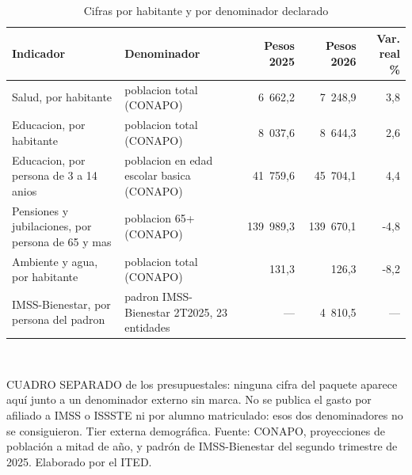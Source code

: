 \begin{table}[htbp]
\centering
\scriptsize
\caption{Cifras por habitante y por denominador declarado}
\label{cua:C14_1}
\begin{tabular}{p{5.0cm}p{4.4cm}rrr}
\toprule
\textbf{Indicador} & \textbf{Denominador} & \textbf{Pesos 2025} & \textbf{Pesos 2026} & \textbf{Var. real \%} \\
\midrule
Salud, por habitante & poblacion total (CONAPO) & 6 662,2 & 7 248,9 & 3,8 \\
Educacion, por habitante & poblacion total (CONAPO) & 8 037,6 & 8 644,3 & 2,6 \\
Educacion, por persona de 3 a 14 anios & poblacion en edad escolar basica (CONAPO) & 41 759,6 & 45 704,1 & 4,4 \\
Pensiones y jubilaciones, por persona de 65 y mas & poblacion 65+ (CONAPO) & 139 989,3 & 139 670,1 & -4,8 \\
Ambiente y agua, por habitante & poblacion total (CONAPO) & 131,3 & 126,3 & -8,2 \\
IMSS-Bienestar, por persona del padron & padron IMSS-Bienestar 2T2025, 23 entidades & --- & 4 810,5 & --- \\
\bottomrule
\end{tabular}
\\[2pt]\begin{minipage}{0.92\textwidth}\scriptsize CUADRO SEPARADO de los presupuestales: ninguna cifra del paquete aparece aquí junto a un denominador externo sin marca. No se publica el gasto por afiliado a IMSS o ISSSTE ni por alumno matriculado: esos dos denominadores no se consiguieron. Tier externa demográfica. Fuente: CONAPO, proyecciones de población a mitad de año, y padrón de IMSS-Bienestar del segundo trimestre de 2025. Elaborado por el ITED.\end{minipage}
\end{table}
